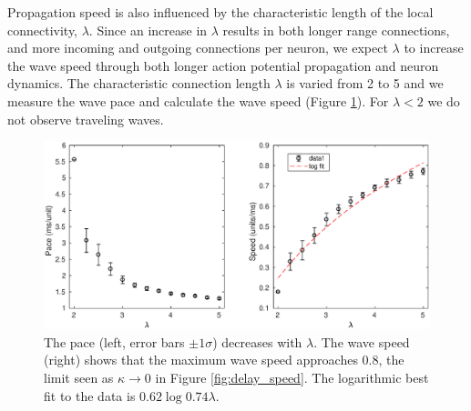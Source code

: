 Propagation speed is also influenced by the characteristic length of the local connectivity, $\lambda$.
Since an increase in $\lambda$ results in both longer range connections, and more incoming and outgoing connections per neuron, 
we expect $\lambda$ to increase the wave speed through both longer action potential propagation\citep{Zhang2016} and neuron dynamics.
The characteristic connection length $\lambda$ is varied from 2 to 5 and we measure the wave pace and calculate the wave speed (Figure \ref{fig:delay_lambda}).
For $\lambda<2$  we do not observe traveling waves.
\begin{figure}[!htb]
 \centering
   \includegraphics[width=\textwidth]{fig/WaveSpeed_Lambda}
   \caption{ The pace (left, error bars $\pm 1 \sigma$) decreases with $\lambda$. 
           The wave speed (right) shows that the maximum wave speed approaches $0.8$, the limit seen as $\kappa \rightarrow 0$ in Figure \ref{fig:delay_speed}. 
           The logarithmic best fit to the data is $0.62\log{0.74\lambda}$.}
   \label{fig:delay_lambda}
\end{figure}

\FloatBarrier

